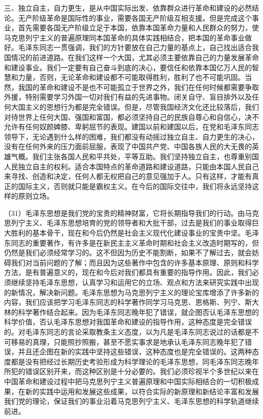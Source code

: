 三、独立自主，自力更生，是从中国实际出发、依靠群众进行革命和建设的必然结论。无产阶级革命是国际性的事业，需要各国无产阶级互相支援。但是完成这个事业，首先需要各国无产阶级立足于本国，依靠本国革命力量和人民群众的努力，使马克思列宁主义的普遍原理同本国革命的具体实践相结合，把本国的革命事业做好。毛泽东同志一贯强调，我们的方针要放在自己力量的基点上，自己找出适合我国情况的前进道路。在我们这样一个大国，尤其必须主要依靠自己的力量发展革命和建设事业。我们一定要有自己奋斗到底的决心，要信任和依靠本国亿万人民的智慧和力量，否则，无论革命和建设都不可能取得胜利，胜利了也不可能巩固。当然，我国的革命和建设不是也不可能孤立于世界之外，我们在任何时候都需要争取外援，特别需要学习外国一切对我们有益的先进事物。闭关自守、盲目排外以及任何大国主义的思想行为都是完全错误。但是，尽管我国经济文化还比较落后，我们对待世界上任何大国、强国和富国，都必须坚持自己的民族自尊心和自信心，决不允许有任何奴颜婢膝、卑躬屈节的表现。建国以前和建国以后，在党和毛泽东同志领导下，无论遇到什么样的困难，我们都没有动摇过独立自主、自力更生的决心，没有在任何外来的压力面前屈服，表现了中国共产党、中国各族人民的大无畏的英雄气概。我们主张各国人民和平共处，平等互助。我们坚持独立自主，也尊重别国人民独立自主的权利。适合本国特点的革命道路和建设道路，只能由本国人民自己来寻找、创造和决定，任何人都无权把自己的意见强加于人。只有这样，才能有真正的国际主义，否则就只能是霸权主义。在今后的国际交往中，我们将永远坚持这样的原则立场。

（31）毛泽东思想是我们党的宝贵的精神财富，它将长期指导我们的行动。由马克思列宁主义、毛泽东思想培育的党的领导者和大批干部，过去是我们的事业取得巨大胜利的基本骨干，现在和今后仍然是社会主义现代化建设事业的宝贵中坚。毛泽东同志的重要著作，有许多是在新民主主义革命时期和社会主义改造时期写的，但仍然是我们必须经常学习的。这不但因为历史不能割断，如果不了解过去，就会妨碍我们对当前问题的了解；而且因为这些著作中包含的许多基本原理、原则和科学方法，是有普遍意义的，现在和今后对我们都具有重要的指导作用。因此，我们必须继续坚持毛泽东思想，认真学习和运用它的立场、观点和方法来研究实践中出现的新情况，解决新问题。毛泽东思想为马克思列宁主义的理论宝库增添了许多新的内容，我们应该把学习毛泽东同志的科学著作同学习马克思、恩格斯、列宁、斯大林的科学著作结合起来。因为毛泽东同志晚年犯了错误，就企图否认毛泽东思想的科学价值，否认毛泽东思想对我国革命和建设的指导作用，这种态度是完全错误的。对毛泽东同志的言论采取教条主义态度，以为凡是毛泽东同志说过的话都是不可移易的真理，只能照抄照搬，甚至不愿实事求是地承认毛泽东同志晚年犯了错误，并且还企图在新的实践中坚持这些错误，这种态度也是完全错误的。这两种态度都是没有把经过长期历史考验形成为科学理论的毛泽东思想，同毛泽东同志晚年所犯的错误区别开来，而这种区别是十分必要的。我们必须珍视半个多世纪以来在中国革命和建设过程中把马克思列宁主义普遍原理和中国实际相结合的一切积极成果，在新的实践中运用和发展这些成果，以符合实际的新原理和新结论丰富和发展我们党的理论，保证我们的事业沿着马克思列宁主义、毛泽东思想的科学轨道继续前进。

